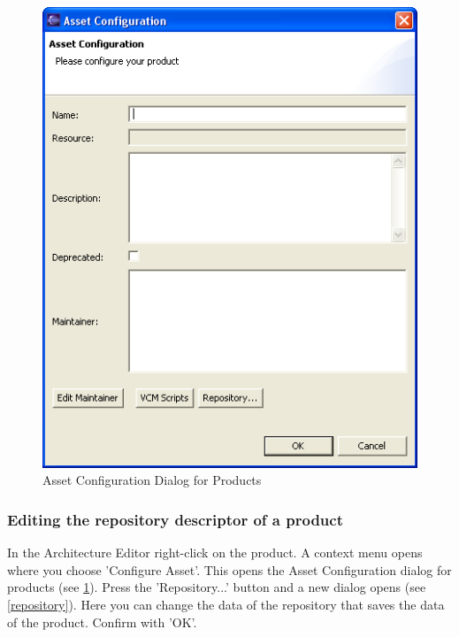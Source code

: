 \begin{figure}[h!]
\begin{center}
\includegraphics[width=12cm]{configp.png}
   \caption{Asset Configuration Dialog for Products}
\label{configp}
\end{center}
\end{figure}\par


\subsubsection{Editing the repository descriptor of a product}
In the Architecture Editor right-click on the product. A context menu opens where
you choose 'Configure Asset'. This opens the Asset Configuration dialog for
products (see \ref{configp}). Press the 'Repository...' button and a new dialog opens (see \ref{repository}).
Here you can change the data of the repository that saves the data of the product. Confirm with 'OK'.

